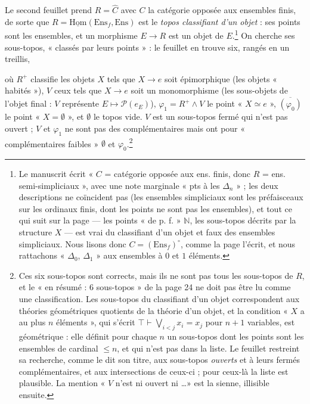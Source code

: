 \documentclass[11pt,a4paper]{article}
\begin{document}
Le second feuillet prend $R = \widehat{C}$ avec $C$ la catégorie opposée
aux ensembles finis, de sorte que $R = \underline{\mathrm{Hom}}(\mathrm{Ens}_{f},
\mathrm{Ens})$ est le \emph{topos classifiant d'un objet} : ses points sont
les ensembles, et un morphisme $E \to R$ est un objet de
$E$.\footnote{Le manuscrit écrit « $C$ = catégorie opposée aux ens. finis,
donc $R$ = ens. semi-simpliciaux », avec une note marginale « pts à les
$\Delta_{n}$ » ; les deux descriptions ne coïncident pas (les ensembles
simpliciaux sont les préfaisceaux sur les ordinaux finis, dont les points
ne sont pas les ensembles), et tout ce qui suit sur la page — les points
« de p. f. » $\mathbb{N}$, les sous-topos décrits par la structure $X$ —
est vrai du classifiant d'un objet et faux des ensembles simpliciaux. Nous
lisons donc $C = (\mathrm{Ens}_{f})^{\circ}$, comme la page l'écrit, et
nous rattachons « $\Delta_{0}$, $\Delta_{1}$ » aux ensembles à $0$ et $1$
éléments.} On cherche ses sous-topos, « classés par leurs points » : le
feuillet en trouve six, rangés en un treillis,


où $R^{+}$ classifie les objets $X$ tels que $X \to e$ soit épimorphique
(les objets « habités »), $V$ ceux tels que $X \to e$ soit un
monomorphisme (les sous-objets de l'objet final : $V$ représente $E
\mapsto \mathcal{P}(e_{E})$), $\varphi_{1} = R^{+} \wedge V$ le point
« $X \simeq e$ », $\overline{(\varphi_{0})}$ le point « $X = \emptyset$ »,
et $\emptyset$ le topos vide. $V$ est un sous-topos fermé qui n'est pas
ouvert ; $V$ et $\varphi_{1}$ ne sont pas des complémentaires mais ont
pour « complémentaires faibles » $\emptyset$ et $\varphi_{0}$.\footnote{Ces six
sous-topos sont corrects, mais ils ne sont pas tous les sous-topos de $R$,
et le « en résumé : 6 sous-topos » de la page 24 ne doit pas être lu comme
une classification. Les sous-topos du classifiant d'un objet correspondent
aux théories géométriques quotients de la théorie d'un objet, et la
condition « $X$ a au plus $n$ éléments », qui s'écrit $\top \vdash
\bigvee_{i<j} x_{i} = x_{j}$ pour $n+1$ variables, est géométrique : elle
définit pour chaque $n$ un sous-topos dont les points sont les ensembles de
cardinal $\leqslant n$, et qui n'est pas dans la liste. Le feuillet
restreint sa recherche, comme le dit son titre, aux sous-topos
\emph{ouverts} et à leurs fermés complémentaires, et aux intersections de
ceux-ci ; pour ceux-là la liste est plausible. La mention « $V$ n'est ni
ouvert ni \ldots » est la sienne, illisible ensuite.}
\end{document}
